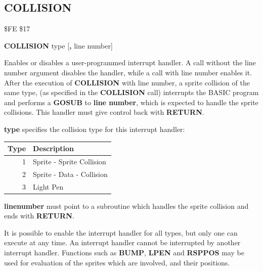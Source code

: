 \subsection{COLLISION}
\begin{description}[leftmargin=2cm,style=nextline]
\item [Token:] \$FE \$17
\item [Format:] {\bf COLLISION} type [{\bf,} line number]
\item [Usage:]  Enables or disables a user-programmed interrupt handler.
                A call without the line number argument disables the handler,
                while a call with line number enables it.
                After the execution of {\bf COLLISION} with
                line number, a sprite collision of the same type,
                (as specified in the {\bf COLLISION} call)
                interrupts the BASIC program and performs a {\bf GOSUB}
                to {\bf line number}, which is expected to handle
                the sprite collisions.
                This handler must give control back with {\bf RETURN}.

                {\bf type} specifies the collision type for
                this interrupt handler:
                    \begin{center}
                    \begin{tabular}{|r|l|}
                    \hline
                    {\bf Type} & {\bf Description}\\
                    \hline
                    1	& 	Sprite - Sprite Collision \\
                    2	& 	Sprite - Data - Collision \\
                    3	& 	Light Pen \\
                    \hline
                    \end{tabular}
                    \end{center}

                {\bf linenumber} must point to a subroutine
                which handles the sprite collision
                and ends with {\bf RETURN}.

\item [Remarks:] It is possible to enable the interrupt handler for
               all types, but only one can execute at any time.
               An interrupt handler cannot be interrupted by another
               interrupt handler.
               Functions such as {\bf BUMP}, {\bf LPEN} and
               {\bf RSPPOS} may be used for evaluation of the sprites
               which are involved, and their positions.


\end{description}
